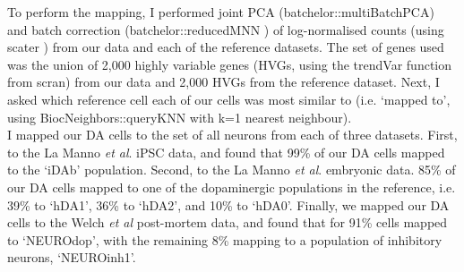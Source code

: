 To perform the mapping, I performed joint PCA (batchelor::multiBatchPCA) 
and batch correction (batchelor::reducedMNN \cite{haghverdi2018batch}) of log-normalised counts (using scater \cite{mccarthy2017scater}) from our data and each of the reference datasets. 
The set of genes used was the union of 2,000 highly variable genes (HVGs, using the trendVar function from scran) 
from our data and 2,000 HVGs from the reference dataset. 
Next, I asked which reference cell each of our cells was most similar to (i.e. ‘mapped to', using BiocNeighbors::queryKNN with k=1 nearest neighbour).\\

I mapped our DA cells to the set of all neurons from each of three datasets.
First, to the La Manno \textit{et al}. iPSC data, and found that
99\% of our DA cells mapped to the `iDAb' population.
Second, to the La Manno \textit{et al}. embryonic data. 
85\% of our DA cells mapped to one of the dopaminergic populations in the reference, i.e. 39\% to `hDA1', 36\% to `hDA2', and 10\% to `hDA0'.
Finally, we mapped our DA cells to the Welch \textit{et al} post-mortem data, and found that for 91\% cells mapped to `NEUROdop', with the remaining 8\% mapping to a population of inhibitory neurons, `NEUROinh1'.









